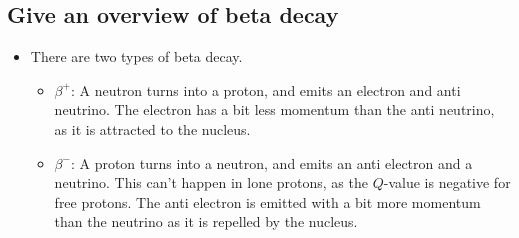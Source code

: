 \documentclass{article}
\begin{document}
\subsection{Give an overview of beta decay}
\begin{itemize}
    \item There are two types of beta decay.
    \begin{itemize}
        \item $β^{+}$: A neutron turns into a proton, and emits an electron and anti neutrino. The electron has a bit less momentum than the anti neutrino, as it is attracted to the nucleus. 
        \item $β^{-}$: A proton turns into a neutron, and emits an anti electron and a neutrino. This can't happen in lone protons, as the $Q$-value is negative for free protons. The anti electron is emitted with a bit more momentum than the neutrino as it is repelled by the nucleus. 
    \end{itemize}
    

\end{itemize}
\end{document}
